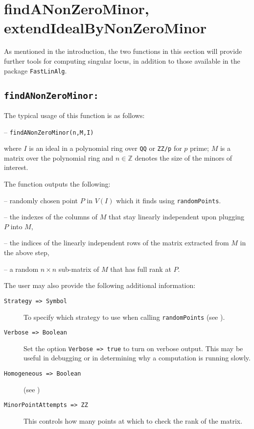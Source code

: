 \documentclass[11pt]{amsart}
\theoremstyle{definition}
\begin{document}
\section{findANonZeroMinor, extendIdealByNonZeroMinor}

As mentioned in the introduction, the two functions in this section will provide further tools for computing singular locus, in addition to those available in the package {\tt FastLinAlg}. 

	\subsection{\tt findANonZeroMinor:}\label{findANonZeroMinor} The typical usage of this function is as follows: 
	
	\vspace{1em}
	-- {\tt findANonZeroMinor(n,M,I)} 
	
	\vspace{1em}
	\noindent where $I$ is an ideal
	in a polynomial ring over {\tt QQ} or {\tt ZZ/p} for $p$ prime; $M$ is a matrix
	over the polynomial ring and $n\in \mathbb{Z}$ denotes the size of the minors of interest.
	
	
	The function outputs the following:
	
	-- randomly chosen point $P$ in $V(I)$ which it finds using {\tt randomPoints}.
	
	-- the indexes of the columns of $M$ that stay linearly independent upon plugging $P$ into $M$, 
	
	-- the indices of the linearly independent rows of the matrix extracted from $M$ in the above step, 
	
	-- a random $n\times n$ sub-matrix of $M$ that has full rank at $P$.
	
The user may also provide the following additional information: 

\begin{description}
	\item[\tt Strategy => Symbol] To specify which strategy to use when calling {\tt randomPoints} (see ).
	
	\item[\tt Verbose => Boolean]
		 Set the option {\tt Verbose => true} to turn on verbose output.  This may be useful in debugging or in determining why a computation is running slowly.
		 
	\item[\tt Homogeneous => Boolean] (see )
	
	\item[\tt MinorPointAttempts => ZZ] 
		This controls how many points at which to check the rank of the matrix.
\end{description}
\end{document}
